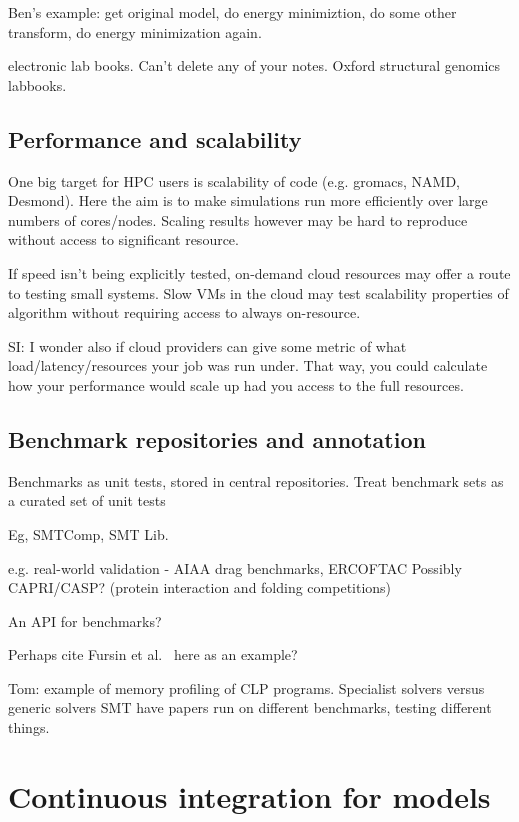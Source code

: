 \documentclass[conference]{IEEEtran}
\begin{document}
Ben's example: get original model, do energy minimiztion, do some other transform, do energy minimization again. 

electronic lab books. Can't delete any of your notes. Oxford structural genomics labbooks. 

\subsection{Performance and scalability}
One big target for HPC users is scalability of code (e.g. gromacs,
NAMD, Desmond). Here the aim is to make simulations run more efficiently
over large numbers of cores/nodes. Scaling results however may be 
hard to reproduce without access to significant resource.

If speed isn't being explicitly tested, on-demand cloud resources 
may offer a route to testing small systems. Slow VMs in the cloud
may test scalability properties of algorithm without requiring access
to always on-resource.

SI: I wonder also if cloud providers can give some metric of what
load/latency/resources your job was run under.  That way, you could
calculate how your performance would scale up had you access to the
full resources. 


\subsection{Benchmark repositories and annotation}


Benchmarks as unit tests, stored in central repositories. 
Treat benchmark sets as a curated set of unit tests

Eg, SMTComp, SMT Lib. 

e.g. real-world validation - AIAA drag benchmarks, ERCOFTAC
	Possibly CAPRI/CASP? (protein interaction and folding competitions)

An API for benchmarks? 

Perhaps cite Fursin et al.~\cite{fursin-et-al:2014} here as an example?

Tom: 
example of memory profiling of CLP programs. Specialist solvers versus 
generic solvers SMT have papers run on different benchmarks, testing different 
things. 

\section{Continuous integration for models}
\end{document}
